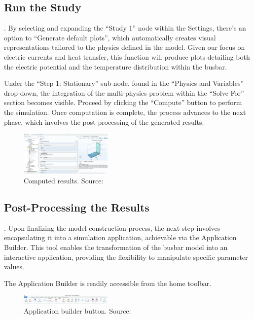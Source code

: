 \subsection{Run the Study}.
By selecting and expanding the ``Study 1'' node within the Settings, there's an option to ``Generate default plots'', which automatically creates visual representations tailored to the physics defined in the model. Given our focus on electric currents and heat transfer, this function will produce plots detailing both the electric potential and the temperature distribution within the busbar.

Under the ``Step 1: Stationary'' sub-node, found in the ``Physics and Variables'' drop-down, the integration of the multi-physics problem within the ``Solve For'' section becomes visible. Proceed by clicking the ``Compute'' button to perform the simulation. Once computation is complete, the process advances to the next phase, which involves the post-processing of the generated results.

\begin{figure}[ht!]
  \centering
  \includegraphics[width=0.4\textwidth]{Chapters/Figures/Chapter 3 Figures/Computed Results.png}
  \caption{Computed results. Source: \cite{multiphysics__modeling_nodate}}
  \label{fig:computed results}
\end{figure}

\subsection{Post-Processing the Results}.
Upon finalizing the model construction process, the next step involves encapsulating it into a simulation application, achievable via the Application Builder. This tool enables the transformation of the busbar model into an interactive application, providing the flexibility to manipulate specific parameter values.

The Application Builder is readily accessible from the home toolbar.

\begin{figure}[ht!]
  \centering
  \includegraphics[width=0.4\textwidth]{Chapters/Figures/Chapter 3 Figures/Application Builder Button.png}
  \caption{Application builder button. Source: \cite{multiphysics__modeling_nodate}}
  \label{fig:application builder button}
\end{figure}

